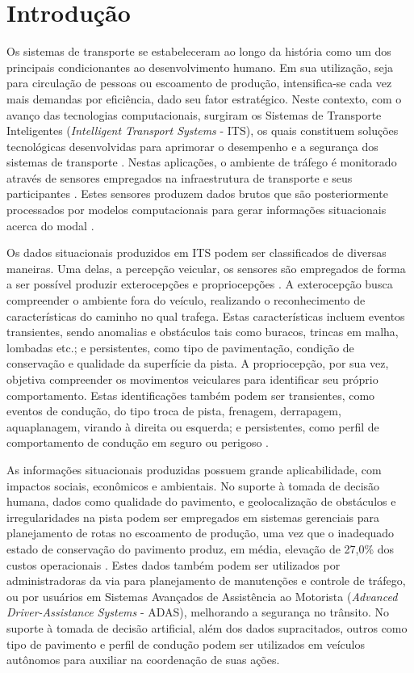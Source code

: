 \chapter{Introdução}
\label{cap:introducao}

Os sistemas de transporte se estabeleceram ao longo da história como um dos principais condicionantes ao desenvolvimento humano. Em sua utilização, seja para circulação de pessoas ou escoamento de produção, intensifica-se cada vez mais demandas por eficiência, dado seu fator estratégico. Neste contexto, com o avanço das tecnologias computacionais, surgiram os Sistemas de Transporte Inteligentes (\textit{Intelligent Transport Systems} - ITS), os quais constituem soluções tecnológicas desenvolvidas para aprimorar o desempenho e a segurança dos sistemas de transporte \cite{Zhang2011,Aragon2016}. Nestas aplicações, o ambiente de tráfego é monitorado através de sensores empregados na infraestrutura de transporte e seus participantes \cite{Zhang2011,mathew2014a,mathew2014b}. Estes sensores produzem dados brutos que são posteriormente processados por modelos computacionais para gerar informações situacionais acerca do modal \cite{Zhang2011}.

Os dados situacionais produzidos em ITS podem ser classificados de diversas maneiras. Uma delas, a percepção veicular, os sensores são empregados de forma a ser possível produzir exterocepções e propriocepções \cite{menegazzo2020}. A exterocepção busca compreender o ambiente fora do veículo, realizando o reconhecimento de características do caminho no qual trafega. Estas características incluem eventos transientes, sendo anomalias e obstáculos tais como buracos, trincas em malha, lombadas etc.; e persistentes, como tipo de pavimentação, condição de conservação e qualidade da superfície da pista. A propriocepção, por sua vez, objetiva compreender os movimentos veiculares para identificar seu próprio comportamento. Estas identificações também podem ser transientes, como eventos de condução, do tipo troca de pista, frenagem, derrapagem, aquaplanagem, virando à direita ou esquerda; e persistentes, como perfil de comportamento de condução em seguro ou perigoso \cite{menegazzo2018,menegazzo2020}.

As informações situacionais produzidas possuem grande aplicabilidade, com impactos sociais, econômicos e ambientais. No suporte à tomada de decisão humana, dados como qualidade do pavimento, e geolocalização de obstáculos e irregularidades na pista podem ser empregados em sistemas gerenciais para planejamento de rotas no escoamento de produção, uma vez que o inadequado estado de conservação do pavimento produz, em média, elevação de 27,0\% dos custos operacionais \cite{CNT2017}. Estes dados também podem ser utilizados por administradoras da via para planejamento de manutenções e controle de tráfego, ou por usuários em Sistemas Avançados de Assistência ao Motorista (\textit{Advanced Driver-Assistance Systems} - ADAS), melhorando a segurança no trânsito. No suporte à tomada de decisão artificial, além dos dados supracitados, outros como tipo de pavimento e perfil de condução podem ser utilizados em veículos autônomos para auxiliar na coordenação de suas ações.

